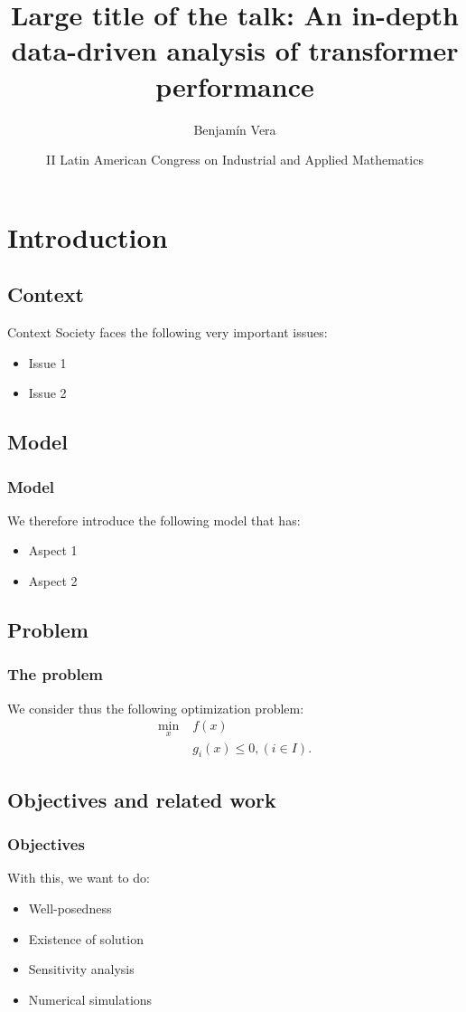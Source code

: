 \documentclass{beamer}
\title[Short title of the talk]{
    \large
    Large title of the talk: An in-depth data-driven analysis of transformer performance
}
\author{Benjamín Vera}
\date[\today]{
	II Latin American Congress on Industrial and Applied Mathematics
}
\begin{document}
\frame{\titlepage}

\section{Introduction}

\subsection{Context}

\begin{frame}{Context}
	Society faces the following very important issues:
    \begin{itemize}
	    \item Issue 1
	    \item Issue 2
    \end{itemize}
\end{frame}

\subsection{Model}

\begin{frame}
	\frametitle{Model}

	We therefore introduce the following model that has:
	\begin{itemize}
		\item Aspect 1
		\item Aspect 2
	\end{itemize}
\end{frame}

\subsection{Problem}

\begin{frame}
	\frametitle{The problem}
	We consider thus the following optimization problem:
	\begin{align*}
		\min_{x}\; & f(x) \\
			 & g_i (x) \leq 0, (i \in I).
	\end{align*}
\end{frame}

\subsection{Objectives and related work}

\begin{frame}
	\frametitle{Objectives}
	With this, we want to do:
	\begin{itemize}
		\item Well-posedness
		\item Existence of solution
		\item Sensitivity analysis
		\item Numerical simulations
	\end{itemize}
\end{frame}
\end{document}
